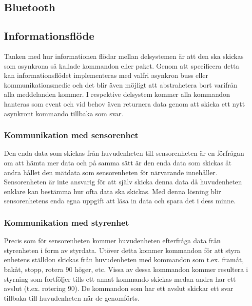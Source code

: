 \documentclass{article}
\begin{document}
\subsection{Bluetooth}

\subsection{Informationsflöde}
Tanken med hur informationen flödar mellan delsystemen är att den ska skickas som asynkrona så kallade kommandon eller paket. Genom att specificera detta kan informationsflödet implementeras med valfri asynkron buss eller kommunikationsmedie och det blir även möjligt att abstrahetera bort varifrån alla meddelanden kommer. I respektive delsystem kommer alla kommandon hanteras som event och vid behov även returnera data genom att skicka ett nytt asynkront kommando tillbaka som svar.

\subsubsection{Kommunikation med sensorenhet}
Den enda data som skickas från huvudenheten till sensorenheten är en förfrågan om att hämta mer data och på samma sätt är den enda data som skickas åt andra hållet den mätdata som sensorenheten för närvarande innehåller. Sensorenheten är inte ansvarig för att själv skicka denna data då huvudenheten enklare kan bestämma hur ofta data ska skickas. Med denna lösning blir sensorenhetens enda egna uppgift att läsa in data och spara det i dess minne.

\subsubsection{Kommunikation med styrenhet}
Precis som för sensorenheten kommer huvudenheten efterfråga data från styrenheten i form av styrdata. Utöver detta kommer kommandon för att styra enhetens ställdon skickas från huvudenheten med kommandon som t.ex. framåt, bakåt, stopp, rotera 90{\textdegree} höger, etc. Vissa av dessa kommandon kommer resultera i styrning som fortföljer tills ett annat kommando skickas medan andra har ett avslut (t.ex. rotering 90{\textdegree}). De kommandon som har ett avslut skickar ett svar tillbaka till huvudenheten när de genomförts.
\end{document}
